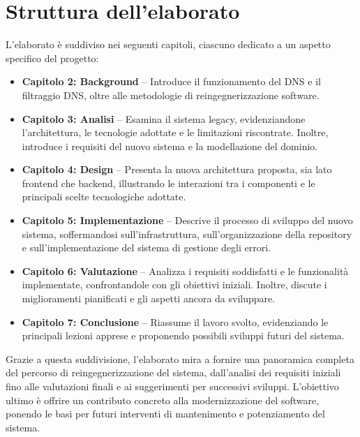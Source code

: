 \section{Struttura dell'elaborato}
L'elaborato è suddiviso nei seguenti capitoli, ciascuno dedicato a un aspetto specifico del progetto:

\begin{itemize}
  \item \textbf{Capitolo 2: Background} – Introduce il funzionamento del DNS e il filtraggio DNS, oltre alle metodologie di reingegnerizzazione software.
  \item \textbf{Capitolo 3: Analisi} – Esamina il sistema legacy, evidenziandone l’architettura, le tecnologie adottate e le limitazioni riscontrate. Inoltre, introduce i requisiti del nuovo sistema e la modellazione del dominio.
  \item \textbf{Capitolo 4: Design} – Presenta la nuova architettura proposta, sia lato frontend che backend, illustrando le interazioni tra i componenti e le principali scelte tecnologiche adottate.
  \item \textbf{Capitolo 5: Implementazione} – Descrive il processo di sviluppo del nuovo sistema, soffermandosi sull’infrastruttura, sull’organizzazione della repository e sull'implementazione del sistema di gestione degli errori.
  \item \textbf{Capitolo 6: Valutazione} – Analizza i requisiti soddisfatti e le funzionalità implementate, confrontandole con gli obiettivi iniziali. Inoltre, discute i miglioramenti pianificati e gli aspetti ancora da sviluppare.
  \item \textbf{Capitolo 7: Conclusione} – Riassume il lavoro svolto, evidenziando le principali lezioni apprese e proponendo possibili sviluppi futuri del sistema.
\end{itemize}

Grazie a questa suddivisione, l’elaborato mira a fornire una panoramica completa del percorso di reingegnerizzazione del sistema, dall’analisi dei requisiti iniziali fino alle valutazioni finali e ai suggerimenti per successivi sviluppi. L’obiettivo ultimo è offrire un contributo concreto alla modernizzazione del software, ponendo le basi per futuri interventi di mantenimento e potenziamento del sistema.

